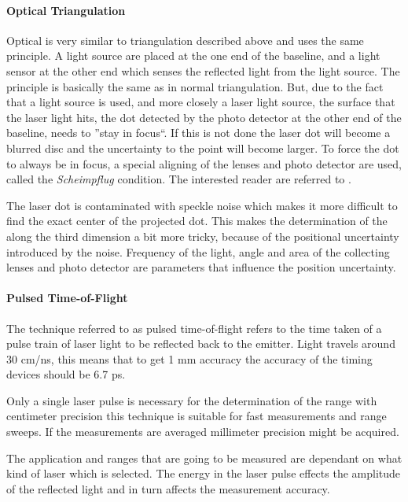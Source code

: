 \paragraph{Optical Triangulation}
Optical is very similar to triangulation described above and uses the same principle.
A light source are placed at the one end of the
baseline, and a light sensor at the other end which senses the reflected light from the
light source. The principle is basically the same as in normal triangulation. But, due to
the fact that a light source is used, and more closely a laser light source, the surface
that the laser light hits, the dot detected by the photo detector at the other end of the
baseline, needs to ''stay in focus``. If this is not done the laser dot will become a
blurred disc and the uncertainty to the point will become larger. To force the dot to
always be in focus, a special aligning of the lenses and photo detector are used, called 
the \emph{Scheimpflug} condition. The interested reader are referred to
\cite{laser-ranging-critical-review}.

The laser dot is contaminated with speckle noise which makes it more difficult to find the
exact center of the projected dot. This makes the determination of the along the third
dimension a bit more tricky, because of the positional uncertainty introduced by the
noise. Frequency of the light, angle and area of the collecting lenses and photo detector
are parameters that influence the position uncertainty. 


\paragraph{Pulsed Time-of-Flight}
The technique referred to as pulsed time-of-flight refers to the time taken of a pulse
train of laser light to be reflected back to the emitter. Light travels around 30 cm/ns,
this means that to get 1 mm accuracy the accuracy of the timing devices should be
6.7 ps.

Only a single laser pulse is necessary for the determination of the range with centimeter
precision this technique is suitable for fast measurements and range sweeps. If the
measurements are averaged millimeter precision might be acquired. 

The application and ranges that are going to be measured are dependant on what kind of
laser which is selected. The energy in the laser pulse effects the amplitude of the
reflected light and in turn affects the measurement accuracy.

